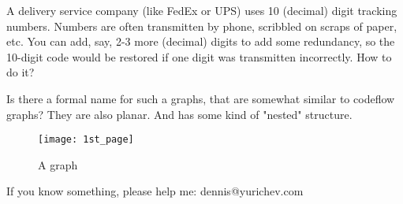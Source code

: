 \myhrule{}

A delivery service company (like FedEx or UPS) uses 10 (decimal) digit tracking numbers.
Numbers are often transmitten by phone, scribbled on scraps of paper, etc.
You can add, say, 2-3 more (decimal) digits to add some redundancy, so the 10-digit code would be restored
if one digit was transmitten incorrectly.
How to do it?

\myhrule{}

Is there a formal name for such a graphs, that are somewhat similar to codeflow graphs?
They are also planar.
And has some kind of "nested" structure.

\begin{figure}[H]
\centering
\texttt{[image: 1st\_page]}
\caption{A graph}
\end{figure}

\myhrule{}

If you know something, please help me: dennis@yurichev.com

